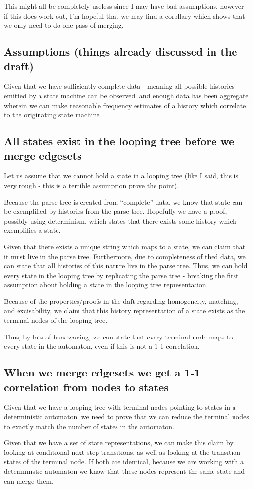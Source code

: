 \documentclass{article}
\begin{document}
This might all be completely useless since I may have bad assumptions, however
if this does work out, I'm hopeful that we may find a corollary which shows that
we only need to do one pass of merging.

\subsection{Assumptions (things already discussed in the draft)}

Given that we have sufficiently complete data - meaning all possible histories
emitted by a state machine can be observed, and enough data has been aggregate
wherein we can make reasonable frequency estimates of a history which
correlate to the originating state machine

\subsection{All states exist in the looping tree before we merge edgesets}

Let us assume that we cannot hold a state in a looping tree (like I said, this
is very rough - this is a terrible assumption prove the point).

Because the parse tree is created from “complete” data, we know that state can
be exemplified by histories from the parse tree. Hopefully we have a proof,
possibly using determinism, which states that there exists some history which
exemplifies a state.

Given that there exists a unique string which maps to a state, we can claim
that it must live in the parse tree. Furthermore, due to completeness of thed
data, we can state that all histories of this nature live in the parse tree.
Thus, we can hold every state in the looping tree by replicating the parse
tree - breaking the first assumption about holding a state in the looping tree
representation.

Because of the properties/proofs in the daft regarding homogeneity, matching,
and excisability, we claim that this history representation of a state exists
as the terminal nodes of the looping tree.

Thus, by lots of handwaving, we can state that every terminal node maps to
every state in the automaton, even if this is not a 1-1 correlation.

\subsection{When we merge edgesets we get a 1-1 correlation from nodes to states}

Given that we have a looping tree with terminal nodes pointing to states in a
deterministic automaton, we need to prove that we can reduce the terminal
nodes to exactly match the number of states in the automaton.

Given that we have a set of state representations, we can make this claim by
looking at conditional next-step transitions, as well as looking at the
transition states of the terminal node. If both are identical, because we are
working with a deterministic automaton we know that these nodes represent the
same state and can merge them.
\end{document}
